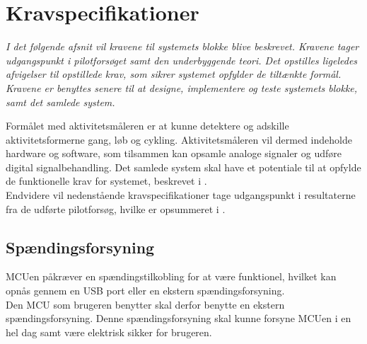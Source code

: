 \section{Kravspecifikationer}\label{Sec:krav}
\textit{I det følgende afsnit vil kravene til systemets blokke blive beskrevet. Kravene tager udgangspunkt i pilotforsøget samt den underbyggende teori. Det opstilles ligeledes afvigelser til opstillede krav, som sikrer systemet opfylder de tiltænkte formål. Kravene er benyttes senere til at designe, implementere og teste systemets blokke, samt det samlede system.}

Formålet med aktivitetsmåleren er at kunne detektere og adskille aktivitetsformerne gang, løb og cykling. Aktivitetsmåleren vil dermed indeholde hardware og software, som tilsammen kan opsamle analoge signaler og udføre digital signalbehandling. Det samlede system skal have et potentiale til at opfylde de funktionelle krav for systemet, beskrevet i . \\
Endvidere vil nedenstående kravspecifikationer tage udgangspunkt i resultaterne fra de udførte pilotforsøg, hvilke er opsummeret i .
%

\subsection{Spændingsforsyning} \label{krav_spaendingsf}
MCUen påkræver en spændingstilkobling for at være funktionel, hvilket kan opnås gennem en USB port eller en ekstern spændingsforsyning.\\
Den MCU som brugeren benytter skal derfor benytte en ekstern spændingsforsyning. Denne spændingsforsyning skal kunne forsyne MCUen i en hel dag samt være elektrisk sikker for brugeren. %

